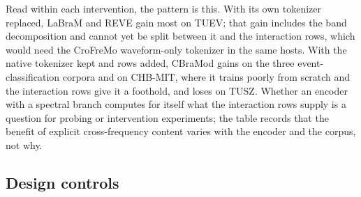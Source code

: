 \begin{table}[t]
\centering
\scriptsize
\caption{Tokenizer benefit across four encoders. The interventions differ
and the numbers are not one quantity: duplex vs.\ waveform-only tokenizer
(CroFreMo); interaction rows vs.\ matched waveform rows added to the
native tokenizer (CBraMod); the whole CroFreMo tokenizer vs.\ the native
tokenizer (LaBraM, REVE). Single seeds.}
\label{tab:content-structure}
\end{table}

Read within each intervention, the pattern is this. With its own
tokenizer replaced, LaBraM and REVE gain most on TUEV; that gain includes
the band decomposition and cannot yet be split between it and the
interaction rows, which would need the CroFreMo waveform-only tokenizer
in the same hosts. With the native tokenizer kept and rows added, CBraMod
gains on the three event-classification corpora and on CHB-MIT, where it
trains poorly from scratch and the interaction rows give it a foothold,
and loses on TUSZ. Whether an encoder with a spectral branch computes for
itself what the interaction rows supply is a question for probing or
intervention experiments; the table records that the benefit of explicit
cross-frequency content varies with the encoder and the corpus, not why.

\subsection{Design controls}
\label{sec:design}

